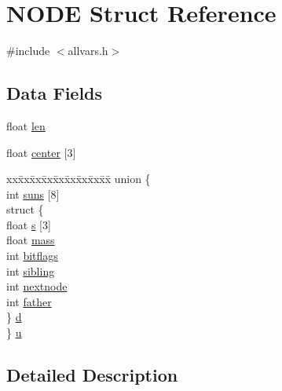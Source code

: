 \hypertarget{structNODE}{
\section{NODE Struct Reference}
\label{structNODE}
}


{\ttfamily \#include $<$allvars.h$>$}

\subsection*{Data Fields}
\begin{DoxyCompactItemize}
\item 
float \hyperlink{structNODE_aae35ad626e2613a4926d4e07fdf9be5c}{len}
\item 
float \hyperlink{structNODE_a27584ddd52a800cbf36c4de8e3fb4bc9}{center} \mbox{[}3\mbox{]}
\item 
\begin{tabbing}
xx\=xx\=xx\=xx\=xx\=xx\=xx\=xx\=xx\=\kill
union \{\\
\>int \hyperlink{structNODE_a2a31ed85a69cd67dce1861bd327ac6e9}{suns} \mbox{[}8\mbox{]}\\
\>struct \{\\
\>\>float \hyperlink{structNODE_a97ef917e39b0cc8a4aae6e6362c4b3bf}{s} \mbox{[}3\mbox{]}\\
\>\>float \hyperlink{structNODE_adfb345bd40fc1835e54589b46622efda}{mass}\\
\>\>int \hyperlink{structNODE_a3678932e5e5b2947409657de4b70e8fc}{bitflags}\\
\>\>int \hyperlink{structNODE_a0e5a3f58232208e4ad8570f801bf5713}{sibling}\\
\>\>int \hyperlink{structNODE_aabf4865245a8afbec1e1cb8e664f41e8}{nextnode}\\
\>\>int \hyperlink{structNODE_a9a1b7edbe811165e40220f63a38f2d16}{father}\\
\>\} \hyperlink{structNODE_a5ab829c8c9c85992ba220635f776de74}{d}\\
\} \hyperlink{structNODE_acd7e6747d70c2205a6fb3d44b6465dd4}{u}\\

\end{tabbing}\end{DoxyCompactItemize}


\subsection{Detailed Description}


